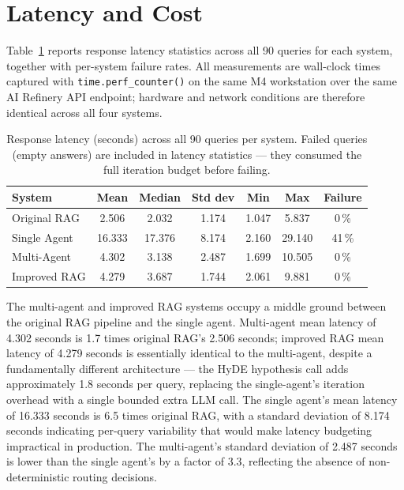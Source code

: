 \section{Latency and Cost}
\label{sec:latency}

Table~\ref{tab:latency} reports response latency statistics across all 90 queries for each system, together with per-system failure rates. All measurements are wall-clock times captured with \texttt{time.perf\_counter()} on the same M4 workstation over the same AI Refinery API endpoint; hardware and network conditions are therefore identical across all four systems.

\begin{table}[ht]
\centering
\small
\setlength{\tabcolsep}{3pt}
\caption{Response latency (seconds) across all 90 queries per system. Failed queries (empty answers) are included in latency statistics — they consumed the full iteration budget before failing.}
\label{tab:latency}
\begin{tabular}{lcccccc}
\hline
\textbf{System} & \textbf{Mean} & \textbf{Median} & \textbf{Std dev} & \textbf{Min} & \textbf{Max} & \textbf{Failure} \\
\hline
Original RAG & 2.506 & 2.032 & 1.174 & 1.047 & 5.837  & 0\,\% \\
Single Agent & 16.333 & 17.376 & 8.174 & 2.160 & 29.140 & 41\,\% \\
Multi-Agent  & 4.302 & 3.138 & 2.487 & 1.699 & 10.505 & 0\,\% \\
Improved RAG & 4.279 & 3.687 & 1.744 & 2.061 & 9.881  & 0\,\% \\
\hline
\end{tabular}
\end{table}

The multi-agent and improved RAG systems occupy a middle ground between the original RAG pipeline and the single agent. Multi-agent mean latency of 4.302 seconds is 1.7 times original RAG's 2.506 seconds; improved RAG mean latency of 4.279 seconds is essentially identical to the multi-agent, despite a fundamentally different architecture — the HyDE hypothesis call adds approximately 1.8 seconds per query, replacing the single-agent's iteration overhead with a single bounded extra LLM call. The single agent's mean latency of 16.333 seconds is 6.5 times original RAG, with a standard deviation of 8.174 seconds indicating per-query variability that would make latency budgeting impractical in production. The multi-agent's standard deviation of 2.487 seconds is lower than the single agent's by a factor of 3.3, reflecting the absence of non-deterministic routing decisions.

